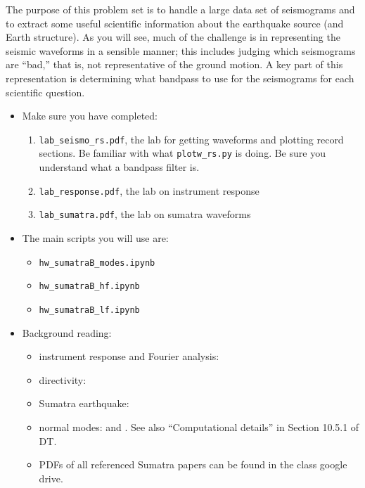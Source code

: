 \documentclass[11pt,titlepage,fleqn]{article}
\newcommand{\tfilemodes}{{\tt hw\_sumatraB\_modes.ipynb}}
\newcommand{\tfilelf}{{\tt hw\_sumatraB\_lf.ipynb}}
\newcommand{\tfilehf}{{\tt hw\_sumatraB\_hf.ipynb}}
\begin{document}
\begin{spacing}{1.0}

The purpose of this problem set is to handle a large data set of seismograms and to extract some useful scientific information about the earthquake source (and Earth structure). As you will see, much of the challenge is in representing the seismic waveforms in a sensible manner; this includes judging which seismograms are ``bad,'' that is, not representative of the ground motion. A key part of this representation is determining what bandpass to use for the seismograms for each scientific question.

\begin{itemize}


\item Make sure you have completed:
%
\begin{enumerate}
\item \verb+lab_seismo_rs.pdf+, the lab for getting waveforms and plotting record sections.
Be familiar with what \verb+plotw_rs.py+ is doing.
Be sure you understand what a bandpass filter is.

\item \verb+lab_response.pdf+, the lab on instrument response

\item \verb+lab_sumatra.pdf+, the lab on sumatra waveforms
\end{enumerate}


\item The main scripts you will use are:
%
\begin{itemize}
\item \tfilemodes\
\item \tfilehf\
\item \tfilelf\
\end{itemize}


\item Background reading:

\begin{itemize}
\item instrument response and Fourier analysis: \citet[][Ch.~6]{SteinWysession}
\item directivity: \citet[][Section 4.3.2]{SteinWysession} 
\item Sumatra earthquake: \citet{Lay2005,Ammon2005,Park2005,Ni2005,SSteinOkal2007}
\item normal modes: \citet[][Section 2.9]{SteinWysession} and \citet[][Ch.~8]{DT}. See also ``Computational details'' in Section 10.5.1 of DT.
\item PDFs of all referenced Sumatra papers can be found in the class google drive.


\end{itemize}
\end{itemize}
\end{spacing}
\end{document}
